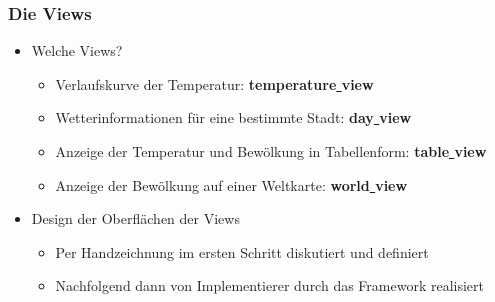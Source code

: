 \begin{frame}
  \frametitle{Die Views}
  \begin{itemize}
    \item Welche Views?
    \begin{itemize}
      \item Verlaufskurve der Temperatur: \textbf{temperature\underline{ }view}
      \item Wetterinformationen f\"ur eine bestimmte Stadt: \textbf{day\underline{ }view}
      \item Anzeige der Temperatur und Bew\"olkung in Tabellenform: \textbf{table\underline{ }view}
      \item Anzeige der Bew\"olkung auf einer Weltkarte: \textbf{world\underline{ }view}
    \end{itemize}
    \item Design der Oberfl\"achen der Views
    \begin{itemize}
      \item Per Handzeichnung im ersten Schritt diskutiert und definiert
      \item Nachfolgend dann von Implementierer durch das Framework realisiert
    \end{itemize}
  \end{itemize}
\end{frame}
